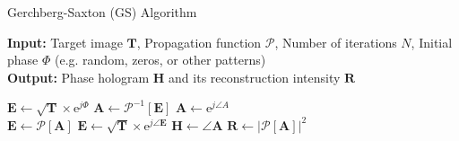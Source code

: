 \begin{algorithm}[H]
  \caption{Gerchberg-Saxton (GS) Algorithm}\label{alg:Gerchberg-Saxton (GS) Algorithm}
  \textbf{Input:} Target image $\textbf{T}$, Propagation function $\mathcal{P}$, Number of iterations $N$, Initial phase $\varPhi$ (e.g. random, zeros, or other patterns) \\
  \textbf{Output:} Phase hologram $\textbf{H}$ and its reconstruction intensity $\textbf{R}$
  \begin{algorithmic}
    \State $\textbf{E} \gets \sqrt{\textbf{T}} \times \mathrm{e}^{j\varPhi}$
    \State $\textbf{A} \gets \mathcal{P}^{-1}[\textbf{E}]$
    \State $\textbf{A} \gets \mathrm{e}^{j\angle A}$\\
    \State $\textbf{E} \gets \mathcal{P}[\textbf{A}]$
    \State $\textbf{E} \gets \sqrt{\textbf{T}} \times \mathrm{e}^{j\angle \textbf{E}}$
    \EndFor
    \State $\textbf{H} \gets \angle \textbf{A}$
    \State $\textbf{R} \gets \vert \mathcal{P}[\textbf{A}] \vert ^2$
  \end{algorithmic}
\end{algorithm}

